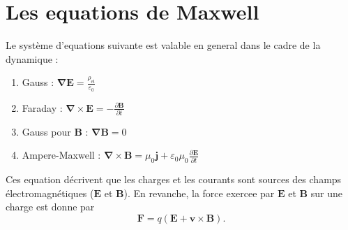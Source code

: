 \section{Les equations de Maxwell}
Le système d'equations suivante est valable en general dans le cadre de la dynamique :
\begin{enumerate}
\item Gauss : $\boldsymbol{\nabla E}=\frac{\rho _{\mathrm{el}}}{\varepsilon_{0}}$
\item Faraday : $\boldsymbol{\nabla}\times \boldsymbol{E}=-\frac{ \partial \boldsymbol{B} }{ \partial t }$
\item Gauss pour $\boldsymbol{B}$ : $\boldsymbol{\nabla B}=0$
\item Ampere-Maxwell : $\boldsymbol{\nabla}\times \boldsymbol{B}=\mu_{0}\boldsymbol{j}+\varepsilon_{0}\mu_{0}\frac{ \partial \boldsymbol{E} }{ \partial t }$
\end{enumerate}
\begin{remark}
Ces equation décrivent que les charges et les courants sont sources des champs électromagnétiques ($\boldsymbol{E}$ et $\boldsymbol{B}$). En revanche, la force exercee par $\boldsymbol{E}$ et $\boldsymbol{B}$ sur une charge est donne par
$$
\boldsymbol{F}=q(\boldsymbol{E}+\boldsymbol{v}\times \boldsymbol{B}).
$$
\end{remark}